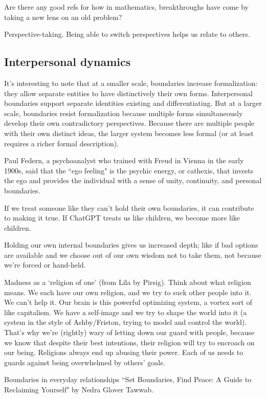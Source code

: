 Are there any good refs for how in mathematics, breakthroughs have come by taking a new lens on an old problem?

Perspective-taking. Being able to switch perspectives helps us relate to others. 


\subsection{Interpersonal dynamics}

It's interesting to note that at a smaller scale, boundaries increase formalization: they allow separate entities to have distinctively their own forms. Interpersonal boundaries support separate identities existing and differentiating. But at a larger scale, boundaries resist formalization because multiple forms simultaneously develop their own contradictory perspectives. Because there are multiple people with their own distinct ideas, the larger system becomes less formal (or at least requires a richer formal description).

Paul Federn, a psychoanalyst who trained with Freud in Vienna in the early 1900s, said that the ``ego feeling" is the psychic energy, or cathexis, that invests the ego and provides the individual with a sense of unity, continuity, and personal boundaries.

If we treat someone like they can't hold their own boundaries, it can contribute to making it true. If ChatGPT treats us like children, we become more like children. 

Holding our own internal boundaries gives us increased depth; like if bad options are available and we choose out of our own wisdom not to take them, not because we're forced or hand-held.

Madness as a `religion of one' (from Lila by Pirsig). Think about what religion means. We each have our own religion, and we try to suck other people into it. We can't help it. Our brain is this powerful optimizing system, a vortex sort of like capitalism. We have a self-image and we try to shape the world into it (a system in the style of Ashby/Friston, trying to model and control the world). That's why we're (rightly) wary of letting down our guard with people, because we know that despite their best intentions, their religion will try to encroach on our being. Religions always end up abusing their power. Each of us needs to guards against being overwhelmed by others' goals. 

Boundaries in everyday relationships ``Set Boundaries, Find Peace: A Guide to Reclaiming Yourself" by Nedra Glover Tawwab. 

